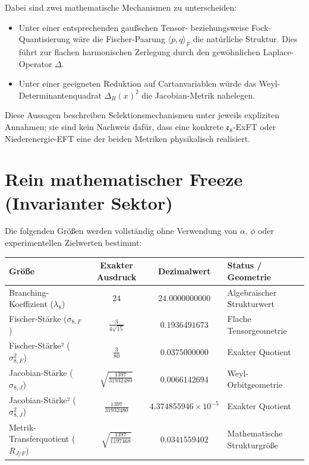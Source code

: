\documentclass[11pt,a4paper]{article}
\begin{document}
Dabei sind zwei mathematische Mechanismen zu unterscheiden:
\begin{itemize}
    \item Unter einer entsprechenden gaußschen Tensor- beziehungsweise Fock-Quantisierung wäre die Fischer-Paarung $\langle p, q \rangle_F$ die natürliche Struktur. Dies führt zur flachen harmonischen Zerlegung durch den gewöhnlichen Laplace-Operator $\Delta$.
    \item Unter einer geeigneten Reduktion auf Cartanvariablen würde das Weyl-Determinantenquadrat $\Delta_R(x)^2$ die Jacobian-Metrik nahelegen.
\end{itemize}

Diese Aussagen beschreiben Selektionsmechanismen unter jeweils expliziten Annahmen; sie sind kein Nachweis dafür, dass eine konkrete $\mathfrak{e}_8$-ExFT oder Niederenergie-EFT eine der beiden Metriken physikalisch realisiert.

\section{Rein mathematischer Freeze (Invarianter Sektor)}

Die folgenden Größen werden vollständig ohne Verwendung von $\alpha$, $\phi$ oder experimentellen Zielwerten bestimmt:

\begin{center}
\begin{tabular}{lccl}
\toprule
\textbf{Größe} & \textbf{Exakter Ausdruck} & \textbf{Dezimalwert} & \textbf{Status / Geometrie} \\
\midrule
Branching-Koeffizient ($\lambda_8$) & $24$ & $24.0000000000$ & Algebraischer Strukturwert \\
Fischer-Stärke ($\sigma_{8,F}$) & $\frac{3}{4\sqrt{15}}$ & $0.1936491673$ & Flache Tensorgeometrie \\
Fischer-Stärke² ($\sigma_{8,F}^2$) & $\frac{3}{80}$ & $0.0375000000$ & Exakter Quotient \\
Jacobian-Stärke ($\sigma_{8,J}$) & $\sqrt{\frac{1397}{31932480}}$ & $0.0066142694$ & Weyl-Orbitgeometrie \\
Jacobian-Stärke² ($\sigma_{8,J}^2$) & $\frac{1397}{31932480}$ & $4.374855946 \times 10^{-5}$ & Exakter Quotient \\
Metrik-Transferquotient ($R_{J/F}$) & $\sqrt{\frac{1397}{1197468}}$ & $0.0341559402$ & Mathematische Strukturgröße \\
\bottomrule
\end{tabular}
\end{center}
\end{document}

